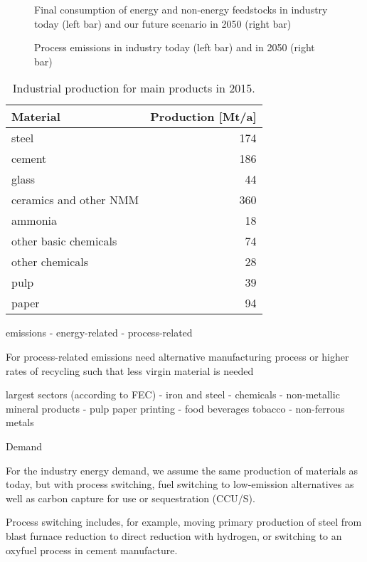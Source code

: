 \begin{figure}
    \caption{Final consumption of energy and non-energy feedstocks in industry today (left bar) and
    our future scenario in 2050 (right bar)}
\end{figure}

\begin{figure}
    \caption{Process emissions in industry today (left bar) and in 2050 (right bar)}
\end{figure}

\begin{table}[t]
    \centering
    \setlength{\tabcolsep}{6pt}
    \begin{tabular}{@{} p{5cm}r @{}}
      \toprule
      Material & Production [Mt/a] \\
      \midrule
      steel & 174 \\
      cement & 186 \\
      glass & 44 \\
      ceramics and other NMM & 360 \\
      ammonia & 18 \\
      other basic chemicals & 74 \\
      other chemicals & 28 \\
      pulp & 39 \\
      paper & 94 \\
    \end{tabular}
    \caption{Industrial production for main products in 2015.}
    \label{tab:industryproduction}
  \end{table}
  
  
emissions
- energy-related
- process-related

For process-related emissions need alternative manufacturing process
or higher rates of recycling such that less virgin material is needed

largest sectors (according to FEC)
- iron and steel
- chemicals
- non-metallic mineral products
- pulp paper printing
- food beverages tobacco
- non-ferrous metals

Demand

For the industry energy demand, we assume the same
production of materials as today, but with process switching, fuel switching to
low-emission alternatives as well as carbon capture for use or sequestration
(CCU/S).

Process switching includes, for example, moving primary production of
steel from blast furnace reduction to direct reduction with hydrogen, or
switching to an oxyfuel process in cement manufacture.

